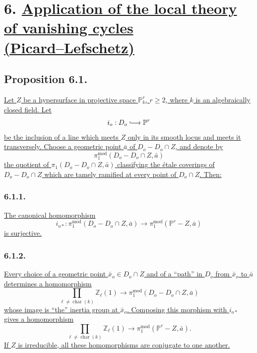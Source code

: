 \section*{6. \underline{Application of the local theory of vanishing cycles}\\
\underline{(Picard--Lefschetz)}}

\subsection*{Proposition 6.1.}
\underline{Let $Z$ be a hypersurface in projective space $\mathbb P^r_k$,
$r\geq2$, where $k$ is an algebraically closed field.  Let}
\[
i_o:D_o\lhook\joinrel\longrightarrow\mathbb P^r
\]
\underline{be the inclusion of a line which meets $Z$ only in its smooth
locus and meets it transversely.  Choose a geometric point $\bar a$ of
$D_o-D_o\cap Z$, and denote by}
\[
\pi_1^{\mathrm{mod}}(D_o-D_o\cap Z,\bar a)
\]
\underline{the quotient of $\pi_1(D_o-D_o\cap Z,\bar a)$ classifying the
étale coverings of $D_o-D_o\cap Z$ which are tamely ramified at every point
of $D_o\cap Z$.  Then:}

\subsubsection*{6.1.1.}
\underline{The canonical homomorphism}
\begin{equation}\tag{6.1.1.1}
i_{o*}:\pi_1^{\mathrm{mod}}(D_o-D_o\cap Z,\bar a)
\longrightarrow
\pi_1^{\mathrm{mod}}(\mathbb P^r-Z,\bar a)
\end{equation}
\underline{is surjective.}

\subsubsection*{6.1.2.}
\underline{Every choice of a geometric point $\bar x_o\in D_o\cap Z$ and
of a ``path'' in $D_o$ from $\bar x_o$ to $\bar a$ determines a
homomorphism}
\begin{equation}\tag{6.1.2.1}
\prod_{\ell\ne\operatorname{char}(k)}\mathbb Z_\ell(1)
\longrightarrow
\pi_1^{\mathrm{mod}}(D_o-D_o\cap Z,\bar a)
\end{equation}
\underline{whose image is ``the'' inertia group at $\bar x_o$.  Composing
this morphism with $i_{o*}$ gives a homomorphism}
\begin{equation}\tag{6.1.2.2}
\prod_{\ell\ne\operatorname{char}(k)}\mathbb Z_\ell(1)
\longrightarrow
\pi_1^{\mathrm{mod}}(\mathbb P^r-Z,\bar a).
\end{equation}
\underline{If $Z$ is irreducible, all these homomorphisms are conjugate to
one another.}

